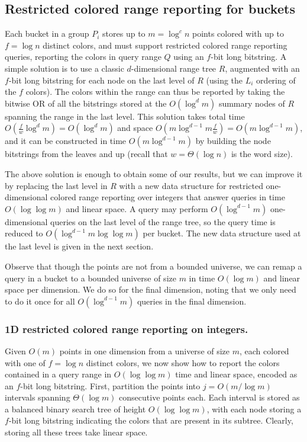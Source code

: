 \subsection{Restricted colored range reporting for buckets}
\label{sec:RCRR}
%
Each bucket in a group $P_i$ stores up to $m = \log^c n$ points colored with up to $f = \log n$ distinct colors, and must support restricted colored range reporting queries, reporting the colors in  query range $Q$ using an $f$-bit long bitstring. A simple solution is to use a classic $d$-dimensional range tree $R$, augmented with an $f$-bit long bitstring for each node on the last level of $R$ (using the $L_i$ ordering of the $f$ colors). The colors within the range can thus be reported by taking the bitwise OR of all the bitstrings stored at the $O(\log^d m)$ summary nodes of $R$ spanning the range in the last level. This solution takes total time $O(\frac{f}{w} \log ^d m) = O(\log ^d m)$ and space $O(m \log ^{d-1} m \frac{f}{w}) = O(m \log ^{d-1} m)$, and it can be constructed in time $O(m \log ^{d-1} m)$ by building the node bitstrings from the leaves and up (recall that $w = \Theta(\log n)$ is the word size). 

The above solution is enough to obtain some of our results, but we can improve it by replacing the last level in $R$ with a new data structure for restricted one-dimensional colored range reporting over integers that answer queries in time $O(\log \log m)$ and linear space. A query may perform $O(\log ^{d-1} m)$ one-dimensional queries on the last level of the range tree, so the query time is reduced to $O(\log ^{d-1} m \log \log m)$ per bucket. The new data structure used at the last level is given in the next section.

Observe that though the points are not from a bounded universe, we can remap a query in a bucket to a bounded universe of size $m$ in time $O(\log m)$ and linear space per dimension. We do so for the final dimension, noting that we only need to do it once for all $O(\log ^{d-1} m)$ queries in the final dimension. 

\subsubsection*{1D restricted colored range reporting on integers.}
%
Given $O(m)$ points in one dimension from a universe of size $m$, each colored with one of $f = \log n$ distinct colors, we now show how to report the colors contained in a query range in $O(\log \log m)$ time and linear space, encoded as an $f$-bit long bitstring. First, partition the points into $j = O(m / \log m)$ intervals spanning $\Theta(\log m)$ consecutive points each. Each interval is stored as a balanced binary search tree of height $O(\log \log m)$, with each node storing a $f$-bit long bitstring indicating the colors that are present in its subtree. Clearly, storing all these trees take linear space.

